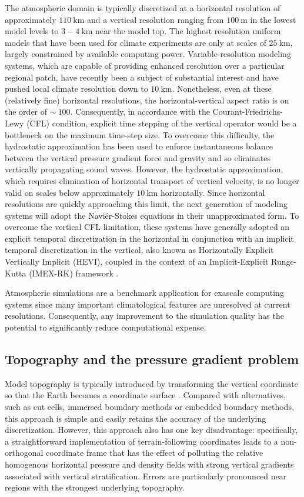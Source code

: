\documentclass[11pt]{article}
\begin{document}
The atmospheric domain is typically discretized at a horizontal resolution of approximately $110\ \mbox{km}$ and a vertical resolution ranging from $100\ \mbox{m}$ in the lowest model levels to $3-4\ \mbox{km}$ near the model top.  The highest resolution uniform models that have been used for climate experiments are only at scales of $25\ \mbox{km}$, largely constrained by available computing power.  Variable-resolution modeling systems, which are capable of providing enhanced resolution over a particular regional patch, have recently been a subject of substantial interest and have pushed local climate resolution down to $10\ \mbox{km}$.  Nonetheless, even at these (relatively fine) horizontal resolutions, the horizontal-vertical aspect ratio is on the order of $\sim\ 100$.  Consequently, in accordance with the Courant-Friedrichs-Lewy (CFL) condition, explicit time stepping of the vertical operator would be a bottleneck on the maximum time-step size.  To overcome this difficulty, the hydrostatic approximation has been used to enforce instantaneous balance between the vertical pressure gradient force and gravity and so eliminates vertically propagating sound waves.  However, the hydrostatic approximation, which requires elimination of horizontal transport of vertical velocity, is no longer valid on scales below approximately $10\ \mbox{km}$ horizontally.  Since horizontal resolutions are quickly approaching this limit, the next generation of modeling systems will adopt the Navi\'er-Stokes equations in their unapproximated form.  To overcome the vertical CFL limitation, these systems have generally adopted an explicit temporal discretization in the horizontal in conjunction with an implicit temporal discretization in the vertical, also known as Horizontally Explicit Vertically Implicit (HEVI), coupled in the context of an Implicit-Explicit Runge-Kutta (IMEX-RK) framework \cite{}.

Atmospheric simulations are a benchmark application for exascale computing systems since many important climatological features are unresolved at current resolutions.  Consequently, any improvement to the simulation quality has the potential to significantly reduce computational expense.

\subsection{Topography and the pressure gradient problem}

Model topography is typically introduced by transforming the vertical coordinate so that the Earth becomes a coordinate surface \cite{}.  Compared with alternatives, such as cut cells, immersed boundary methods or embedded boundary methods, this approach is simple and easily retains the accuracy of the underlying discretization.  However, this approach also has one key disadvantage:  specifically, a straightforward implementation of terrain-following coordinates leads to a non-orthogonal coordinate frame that has the effect of polluting the relative homogenous horizontal pressure and density fields with strong vertical gradients associated with vertical stratification.  Errors are particularly pronounced near regions with the strongest underlying topography.
\end{document}
